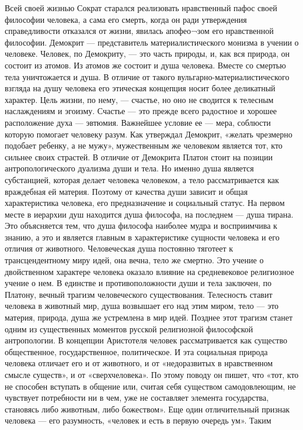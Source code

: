 \documentclass[12pt]{article}
\begin{document}
Всей своей жизнью Сократ старался реализовать нравственный пафос своей философии человека, а сама его
смерть, когда он ради утверждения справедливости отказался от жизни, явилась апофео¬зом его нравственной
философии.
Демокрит — представитель материалистического монизма в учении о человеке. Человек, по Демокриту, — это
часть природы, и, как вся природа, он состоит из атомов. Из атомов же состоит и душа человека. Вместе со
смертью  тела уничтожается  и душа.  В отличие  от такого вульгарно-материалистического  взгляда  на душу
человека его этическая концепция носит более деликатный характер. Цель жизни, по нему, — счастье, но оно не
сводится к телесным наслаждениям и эгоизму. Счастье — это прежде всего радостное и хорошее расположение
духа — эвтюмия. Важнейшее условие ее — мера, соблюсти которую помогает человеку разум. Как утверждал
Демокрит, «желать чрезмерно подобает ребенку, а не мужу», мужественным же человеком является тот, кто
сильнее своих страстей.
В отличие от Демокрита Платон стоит на позиции антропологического дуализма души и тела. Но именно душа
является субстанцией, которая делает человека человеком, а тело рассматривается как враждебная ей материя.
Поэтому от качества души зависит и общая характеристика человека, его предназначение и социальный статус.
На первом месте в иерархии душ находится душа философа, на последнем — душа тирана. Это объясняется
тем, что душа философа наиболее мудра и восприимчива к знанию, а это и является главным в характеристике
сущности человека и его отличия от животного.
Человеческая душа постоянно тяготеет к трансцендентному миру идей, она вечна, тело же смертно. Это учение
о двойственном характере человека оказало влияние на средневековое религиозное учение о нем. В единстве и
противоположности  души  и  тела  заключен,  по  Платону,  вечный  трагизм  человеческого  существования.
Телесность ставит человека  в  животный  мир,  душа  возвышает его  над этим  миром, тело  — это материя,
природа, душа же устремлена в мир идей. Позднее этот трагизм станет одним из существенных моментов
русской религиозной философской антропологии.
В концепции Аристотеля человек рассматривается как существо общественное, государственное, политическое.
И эта социальная природа человека отличает его и от животного, и от «недоразвитых в нравственном смысле
существ», и от «сверхчеловека». По этому поводу он пишет, что «тот, кто не способен вступать в общение или,
считая  себя  существом  самодовлеющим,  не  чувствует  потребности  ни  в  чем,  уже  не  составляет  элемента
государства, становясь либо животным, либо божеством».
Еще один отличительный признак человека — его разумность, «человек и есть в первую очередь ум». Таким
\end{document}
